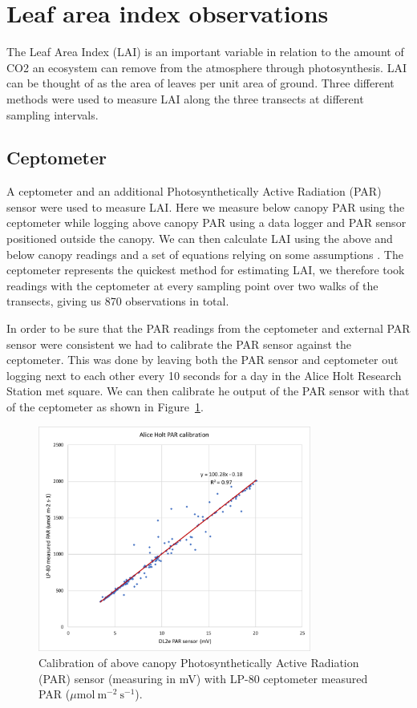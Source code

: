 \documentclass[11pt]{article}
\begin{document}
\section{Leaf area index observations}

The Leaf Area Index (LAI) is an important variable in relation to the amount of CO2 an ecosystem can remove from the atmosphere through photosynthesis. LAI can be thought of as the area of leaves per unit area of ground. Three different methods were used to measure LAI along the three transects at different sampling intervals. 

\subsection{Ceptometer}

A ceptometer and an additional Photosynthetically Active Radiation (PAR) sensor were used to measure LAI. Here we measure below canopy PAR using the ceptometer while logging above canopy PAR using a data logger and PAR sensor positioned outside the canopy. We can then calculate LAI using the above and below canopy readings and a set of equations relying on some assumptions \citep{fassnacht1994comparison}. The ceptometer represents the quickest method for estimating LAI, we therefore took readings with the ceptometer at every sampling point over two walks of the transects, giving us 870 observations in total.

In order to be sure that the PAR readings from the ceptometer and external PAR sensor were consistent we had to calibrate the PAR sensor against the ceptometer. This was done by leaving both the PAR sensor and ceptometer out logging next to each other every 10 seconds for a day in the Alice Holt Research Station met square. We can then calibrate he output of the PAR sensor with that of the ceptometer as shown in Figure~\ref{fig:par_calib}. 

\begin{figure}[ht]
    \centering
    \includegraphics[width=0.8\textwidth]{AH_PAR.pdf}
    \caption{Calibration of above canopy Photosynthetically Active Radiation (PAR) sensor (measuring in mV) with LP-80 ceptometer measured PAR (\(\mu \text{mol}~\text{m}^{-2}~\text{s}^{-1} \)).} \label{fig:par_calib}
\end{figure}
\end{document}
